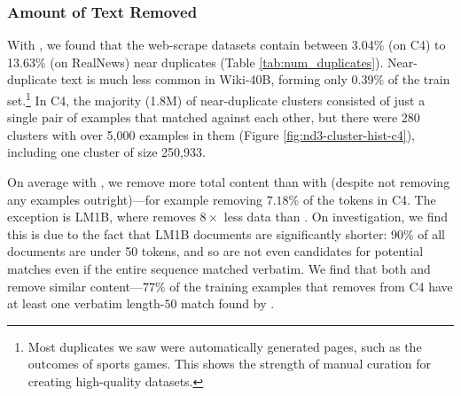 



\subsubsection{Amount of Text Removed}
With \Approx{}, we found that the web-scrape datasets contain between 3.04\% (on C4) to 13.63\% (on RealNews) near duplicates (Table \ref{tab:num_duplicates}).
Near-duplicate text is much less common in Wiki-40B, forming only 0.39\% of the train set.\footnote{Most duplicates we saw were automatically generated pages, such as the outcomes of sports games.
This shows the strength of manual curation for creating high-quality datasets.}
In C4, the majority (1.8M) of near-duplicate clusters consisted of just a single pair of examples that matched against each other, but there were 280 clusters with over 5,000 examples in them (Figure \ref{fig:nd3-cluster-hist-c4}), including one cluster of size 250,933.

On average with \Exact{}, we remove more total content than with \Approx{} (despite \Exact{} not removing any examples outright)---for example removing $7.18\%$ of the tokens in C4.
%
The exception is LM1B, where \Exact{} removes $8\times$ less data than
\Approx{}.
On investigation, we find this is due to the fact that LM1B documents are significantly shorter: $90\%$ of all documents are under 50 tokens, and so are not even candidates for potential matches even if the entire sequence matched verbatim.
%
We find that both \Approx{} and \Exact{} remove similar content---$77\%$ of the training examples that \Approx{} removes from C4 have at least one verbatim length-$50$ match found by \Exact{}.





